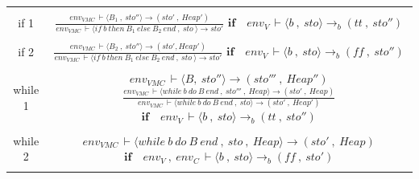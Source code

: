 \begin{table}[H]
\begin{adjustbox}{center}
\begin{tabular}{|c|c|}
\hline
\vspace {0.1pt} & \\
  if 1 &  \pbox{20cm}{\huge\(\frac{env_{VMC}\, \vdash \langle B_1\: ,\ sto'' \rangle \rightarrow (sto'\: ,\ Heap')}{ env_{VMC}\, \vdash \langle if\ b\ then\ B_1\ else\ B_2\ end\: ,\ sto\ \rangle \rightarrow sto'}\) \\ \normalsize\(\textbf{if} \quad env_V\, \vdash \langle b\: ,\ sto \rangle \rightarrow_b (\textit{tt}\: ,\ sto'')\)} \vspace{0.1pt} \\ \hline 
    \vspace {0.1pt} & \\
 if 2 &   \pbox{20cm}{\huge\(\frac{env_{VMC}\, \vdash \langle B_2\: ,\ sto'' \rangle \rightarrow (sto', Heap')}{ env_{VMC}\, \vdash \langle if\ b\ then\ B_1\ else\ B_2\ end\: ,\ sto\ \rangle \rightarrow sto'}\) \\ \normalsize\(\textbf{if} \quad env_V\, \vdash  \langle b\: ,\ sto \rangle \rightarrow_b (\textit{ff}\: ,\ sto'')\)} \vspace{0.1pt} \\ \hline 
    \vspace {0.1pt} & \\
  while 1 &  \pbox{20cm}{\Large \(env_{VMC}\, \vdash \langle B,\: sto'' \rangle \rightarrow (sto'''\: ,\ Heap'')\)\\
  \huge \(\frac{env_{VMC}\, \vdash \langle while\ b\ do\ B\ end\: ,\ sto'''\: ,\ Heap \rangle \rightarrow (sto'\: ,\ Heap)}{env_{VMC}\, \vdash \langle while\ b\ do\ B\ end\: ,\ sto \rangle \rightarrow (sto'\: ,\ Heap')} \) \\ \normalsize\(\textbf{if} \quad env_V\, \vdash \langle b\: ,\ sto \rangle \rightarrow_b (\textit{tt}\: ,\ sto'')\)} \vspace{0.1pt} \\ \hline 
\vspace {0.1pt} & \\
  while 2 &  \pbox{20cm}{\Large\(env_{VMC}\, \vdash \langle while\ b\ do\ B\ end\: ,\ sto\: ,\ Heap \rangle \rightarrow (sto'\: ,\ Heap)\) \\ \normalsize\(\textbf{if} \quad env_V\: ,\ env_C \, \vdash  \langle b\: ,\ sto \rangle \rightarrow_b (\textit{ff}\: ,\ sto')\)} \vspace{0.1pt} \\ \hline 
\vspace {0.1pt} & \\

\end{tabular}
\end{adjustbox}
\end{table}
